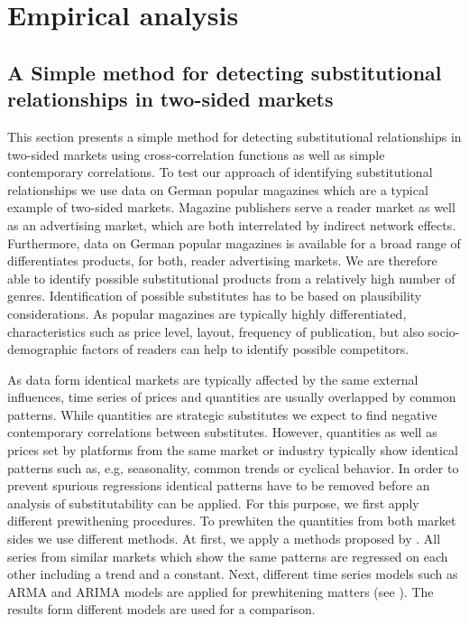 \documentclass[12pt,a4paper,notitlepage]{article}
\begin{document}




\section{Empirical analysis}\label{empirical}

\subsection{A Simple method for detecting substitutional relationships in two-sided markets}

This section presents a simple method for detecting substitutional relationships in two-sided markets using cross-correlation functions as well as simple contemporary correlations. To test our approach of identifying substitutional relationships we use data on German popular magazines which are a typical example of two-sided markets. Magazine publishers serve a reader market as well as an advertising market, which are both interrelated by indirect network effects. Furthermore, data on German popular magazines is available for a broad range of differentiates products, for both, reader advertising markets. We are therefore able to identify possible substitutional products from a relatively high number of genres. Identification of possible substitutes has to be based on plausibility considerations. As popular magazines are typically highly differentiated, characteristics such as price level, layout, frequency of publication, but also socio-demographic factors of readers can help to identify possible competitors.  

As data form identical markets are typically affected by the same external influences, time series of prices and quantities are usually overlapped by common patterns. While quantities are strategic substitutes we expect to find negative contemporary correlations between substitutes. However, quantities as well as prices set by platforms from the same market or industry typically show identical patterns such as, e.g, seasonality, common trends or cyclical behavior. In order to prevent spurious regressions identical patterns have to be removed before an analysis of substitutability can be applied. For this purpose, we first apply different prewithening procedures. To prewhiten the quantities from both market sides we use different methods. At first, we apply a methods proposed by \cite{dewenter_essays_2004}. All series from similar markets which show the same patterns are regressed on each other including a trend and a constant. Next, different time series models such as ARMA and ARIMA models are applied for prewhitening matters (see \cite{box_time_2008}). The results form different models are used for a comparison.
\end{document}
